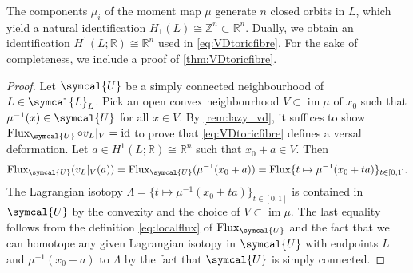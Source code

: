 \documentclass[12pt,a4paper,abstract=true,draft]{scrartcl}
\DeclareMathOperator{\id}{id}
\begin{document}
The components $\mu_i$ of the moment map $\mu$ generate $n$ closed orbits in $L$, which yield a natural identification $H_1(L) \cong \mathbb{Z}^n \subset \mathbb{R}^n$.
Dually, we obtain an identification $H^1(L;\mathbb{R}) \cong \mathbb{R}^n$ used in \eqref{eq:VDtoricfibre}.
For the sake of completeness, we include a proof of \cref{thm:VDtoricfibre}.

\begin{proof}
    Let $\symcal{U}$ be a simply connected neighbourhood of $L \in \symcal{L}_{L}$.
    Pick an open convex neighbourhood $V \subset \operatorname{im} \mu$ of $x_0$ such that $\mu^{-1}(x) \in \symcal{U}$ for all $x \in V$.
    By \cref{rem:lazy_vd}, it suffices to show $\operatorname{Flux}_{\symcal{U}} \circ v_L\vert_{V} = \id$ to prove that \eqref{eq:VDtoricfibre} defines a versal deformation.
    Let $a \in H^1(L;\mathbb{R}) \cong \mathbb{R}^n$ such that $x_0 + a \in V$.
Then 
    \begin{equation}
        \operatorname{Flux}_{\symcal{U}} ( v_L\vert_{V} (a))
        = \operatorname{Flux}_{\symcal{U}} (\mu^{-1}(x_0 + a))
        = \operatorname{Flux} \{t \mapsto \mu^{-1}(x_0 + ta) \}_{t \in [0,1]}.
    \end{equation}
    The Lagrangian isotopy $\Lambda = \{t \mapsto \mu^{-1}(x_0 + ta) \}_{t \in [0,1]}$ is contained in $\symcal{U}$ by the convexity and the choice of $V \subset \operatorname{im} \mu$.
    The last equality follows from the definition \eqref{eq:localflux} of $\operatorname{Flux}_{\symcal{U}}$ and the fact that we can homotope any given Lagrangian isotopy in $\symcal{U}$ with endpoints $L$ and $\mu^{-1}(x_0 + a)$ to $\Lambda$ by the fact that $\symcal{U}$ is simply connected. 


\end{proof}
\end{document}
